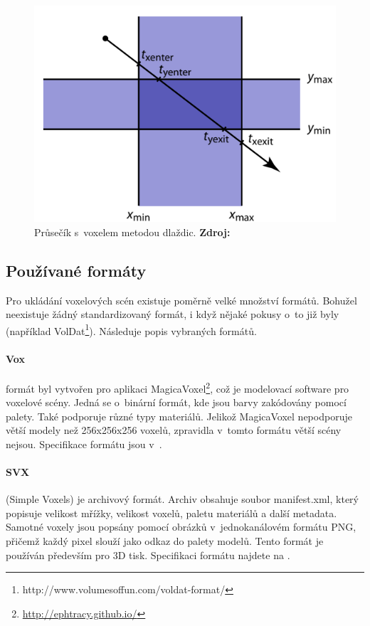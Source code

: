 \begin{figure}[H]
	\centering
	\includegraphics[scale=1.3]{obrazky-figures/slab_intersect.png}
	\caption{Průsečík s~voxelem metodou dlaždic. \textbf{Zdroj: \cite{Cunha13}}}
	\label{fig:slabs}
\end{figure}


\subsection{Používané formáty} \label{sec:format}
Pro ukládání voxelových scén existuje poměrně velké množství formátů. Bohužel neexistuje žádný standardizovaný formát, i když nějaké pokusy o~to již byly (například VolDat\footnote{http://www.volumesoffun.com/voldat-format/}). Následuje popis vybraných formátů.

\paragraph{Vox} formát byl vytvořen pro aplikaci MagicaVoxel\footnote{\url{http://ephtracy.github.io/}}, což je modelovací software pro voxelové scény. Jedná se o~binární formát, kde jsou barvy zakódovány pomocí palety. Také podporuje různé typy materiálů. Jelikož MagicaVoxel nepodporuje větší modely než 256x256x256 voxelů, zpravidla v~tomto formátu větší scény nejsou. Specifikace formátu jsou v~\cite{vox_format}.

\paragraph{SVX} (Simple Voxels) je archivový formát. Archiv obsahuje soubor manifest.xml, který popisuje velikost mřížky, velikost voxelů, paletu materiálů a další metadata. Samotné voxely jsou popsány pomocí obrázků v~jednokanálovém formátu PNG, přičemž každý pixel slouží jako odkaz do palety modelů. Tento formát je používán především pro 3D tisk. Specifikaci formátu najdete na \cite{svx_format_2014}.

